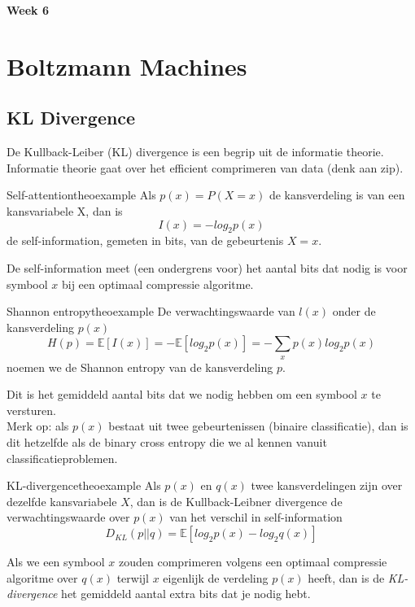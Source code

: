 {\large
\textbf{{\LARGE Week 6}}
\section{Boltzmann Machines}
\subsection{KL Divergence}
De Kullback-Leiber (KL) divergence is een begrip uit de informatie theorie. Informatie theorie gaat over het efficient comprimeren van data (denk aan zip).\\

\begin{mytheo}{Self-attention}{theoexample}
Als $p(x)=P(X=x)$ de kansverdeling is van een kansvariabele X, dan is
\[I(x)=-log_2p(x)\]
de self-information, gemeten in bits, van de gebeurtenis $X=x$.
\end{mytheo}
\noindent De self-information meet (een ondergrens voor) het aantal bits dat nodig is voor symbool $x$ bij een optimaal compressie algoritme.

\begin{mytheo}{Shannon entropy}{theoexample}
De verwachtingswaarde van $l(x)$ onder de kansverdeling $p(x)$
\[H(p)=\mathbb{E}[I(x)]=-\mathbb{E}[log_2p(x)]=-\sum_xp(x)log_2p(x)\]
noemen we de Shannon entropy van de kansverdeling $p$.
\end{mytheo}
\noindent Dit is het gemiddeld aantal bits dat we nodig hebben om een symbool $x$ te versturen.\\

\noindent Merk op: als $p(x)$ bestaat uit twee gebeurtenissen (binaire classificatie), dan is dit hetzelfde als de binary cross entropy die we al kennen vanuit classificatieproblemen.

\begin{mytheo}{KL-divergence}{theoexample}
Als $p(x)$ en $q(x)$ twee kansverdelingen zijn over dezelfde kansvariabele $X$, dan is de Kullback-Leibner divergence de verwachtingswaarde over $p(x)$ van het verschil in self-information
\[D_{KL}(p||q)=\mathbb{E}[log_2p(x)-log_2q(x)]\]
\end{mytheo}
\noindent Als we een symbool $x$ zouden comprimeren volgens een optimaal compressie algoritme over $q(x)$ terwijl $x$ eigenlijk de verdeling $p(x)$ heeft, dan is de \textit{KL-divergence} het gemiddeld aantal extra bits dat je nodig hebt.

}
